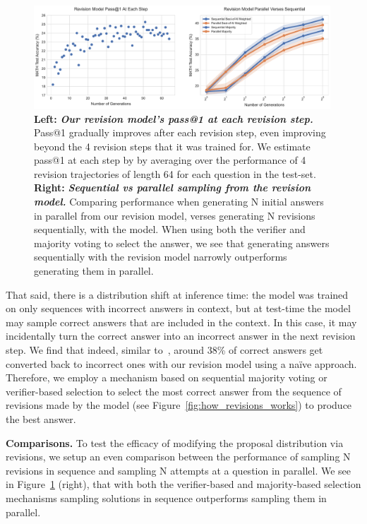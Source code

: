 \begin{figure}
    \centering
    \includegraphics[width=0.99\textwidth]{figures/pass1_and_comparing_seq_parallel.pdf}
    \vspace{-0.3cm}
    \caption{\footnotesize{\textbf{Left:} \textbf{\emph{Our revision model's pass@1 at each revision step.}} Pass@1 gradually improves after each revision step, even improving beyond the 4 revision steps that it was trained for. We estimate pass@1 at each step by by averaging over the performance of 4 revision trajectories of length 64 for each question in the test-set. \textbf{Right:} \textbf{\emph{Sequential vs parallel sampling from the revision model.}} Comparing performance when generating N initial answers in parallel from our revision model, verses generating N revisions sequentially, with the model. When using both the verifier and majority voting to select the answer, we see that generating answers sequentially with the revision model narrowly outperforms generating them in parallel.}}
    \label{fig:revision_model_results}
    \vspace{-0.3cm}
\end{figure}
That said, there is a distribution shift at inference time: the model was trained on only sequences with incorrect answers in context, but at test-time the model may sample correct answers that are included in the context.
In this case, it may incidentally turn the correct answer into an incorrect answer in the next revision step.
We find that indeed, similar to~\citet{qu2024recursive}, around 38\% of correct answers get converted back to incorrect ones with our revision  model using a na\"ive approach. Therefore, we employ a mechanism based on sequential majority voting or verifier-based selection to select the most correct answer from the sequence of revisions made by the model (see Figure~\ref{fig:how_revisions_works}) to produce the best answer.

\textbf{Comparisons.} To test the efficacy of modifying the proposal distribution via revisions, we setup an even comparison between the performance of sampling N revisions in sequence and sampling N attempts at a question in parallel. We see in Figure~\ref{fig:revision_model_results} (right), that with both the verifier-based and majority-based selection mechanisms sampling solutions in sequence outperforms sampling them in parallel.

